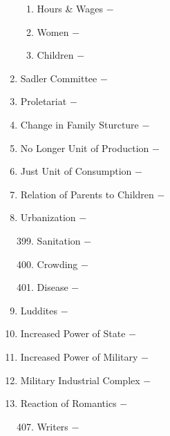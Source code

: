 \documentclass[12pt]{article}
\begin{document}
\begin{enumerate}
\begin{enumerate}[label=\arabic{*}.]
\item Hours \& Wages $-$

\item Women $-$

\item Children $-$ 


\end{enumerate}
\setcounter{enumi}{391}

\item Sadler Committee $-$ 

\item Proletariat $-$ 

\item Change in Family Sturcture $-$ 

\item No Longer Unit of Production $-$ 

\item Just Unit of Consumption $-$ 

\item Relation of Parents to Children $-$ 

\item Urbanization $-$ 

\begin{enumerate}[label=\arabic{*}.]
\setcounter{enumii}{398}

\item Sanitation $-$

\item Crowding $-$

\item Disease $-$ 


\end{enumerate}
\setcounter{enumi}{401}

\item Luddites $-$ 

\item Increased Power of State $-$ 

\item Increased Power of Military $-$ 

\item Military Industrial Complex $-$ 

\item Reaction of Romantics $-$ 

\begin{enumerate}[label=\arabic{*}.]
\setcounter{enumii}{406}

\item Writers $-$ 


\end{enumerate}
\end{enumerate}
\end{document}
